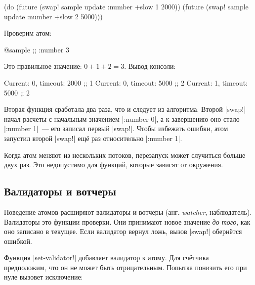 \begin{english}
  \begin{clojure}
(do (future (swap! sample update :number +slow 1 2000))
    (future (swap! sample update :number +slow 2 5000)))
  \end{clojure}
\end{english}

\noindent
Проверим атом:

\begin{english}
  \begin{clojure}
@sample ;; {:number 3}
  \end{clojure}
\end{english}

\noindent
Это правильное значение: $0 + 1 + 2 = 3$. Вывод консоли:

\begin{english}
  \begin{text}
Current: 0, timeout: 2000 ;; 1
Current: 0, timeout: 5000 ;; 2
Current: 1, timeout: 5000 ;; 2
  \end{text}
\end{english}

Вторая функция сработала два раза, что и следует из алгоритма. Второй
\spverb|swap!| начал расчеты с начальным значением \spverb|{:number 0}|, а к
завершению оно стало \spverb|{:number 1}|~--- его записал первый
\spverb|swap!|. Чтобы избежать ошибки, атом запустил второй \spverb|swap!|
ещ\"{е} раз относительно \spverb|{:number 1}|.

Когда атом меняют из нескольких потоков, перезапуск может случиться больше двух
раз. Это недопустимо для функций, которые зависят от окружения.

\subsection{Валидаторы и вотчеры}


Поведение атомов расширяют валидаторы и вотчеры (анг. \emph{watcher},
наблюдатель). Валидаторы это функции проверки. Они принимают новое значение
\emph{до того}, как оно записано в текущее. Если валидатор вернул ложь, вызов
\spverb|swap!| обернётся ошибкой.


Функция \spverb|set-validator!| добавляет валидатор к атому. Для сч\"{е}тчика
предположим, что он не может быть отрицательным. Попытка понизить его при нуле
вызовет исключение:

